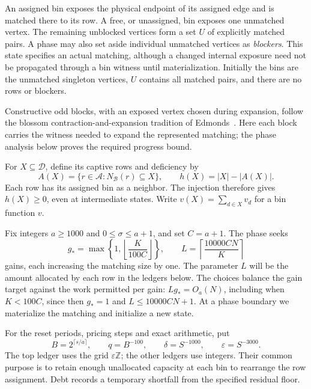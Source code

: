 An assigned bin exposes the physical endpoint of its assigned edge
and is matched there to its row.  A free, or unassigned, bin exposes
one unmatched vertex.  The remaining unblocked vertices form a set
\(U\) of explicitly matched pairs.  A phase may also set aside
individual unmatched vertices as \emph{blockers}.  This state specifies
an actual matching, although a changed internal exposure need not be
propagated through a bin witness until materialization.  Initially the
bins are the unmatched singleton vertices, \(U\) contains all matched
pairs, and there are no rows or blockers.

Constructive odd blocks, with an exposed vertex chosen during expansion,
follow the blossom contraction-and-expansion tradition of
Edmonds~\cite[Sections~4.10--4.14 and 7.1--7.2]{EdmondsPaths}.
Here each block carries the witness needed to expand the represented
matching; the phase analysis below proves the required progress bound.

For \(X\subseteq\mathcal D\), define its captive rows and deficiency by
\begin{equation}
 A(X)=\{r\in\mathcal A:N_{\mathcal B}(r)\subseteq X\},
 \qquad h(X)=|X|-|A(X)|.
 \label{match:deficiency}
\end{equation}
Each row has its assigned bin as a neighbor.  The injection therefore
gives \(h(X)\ge0\), even at intermediate states.
Write \(v(X)=\sum_{d\in X}v_d\) for a bin function \(v\).

Fix integers \(a\ge1000\) and \(0\le\sigma\le a+1\), and set
\(C=a+1\).  The phase seeks
\begin{equation}
 g_*=\max\left\{1,\left\lfloor\frac{K}{100C}\right\rfloor\right\},
 \qquad L=\left\lceil\frac{10000CN}{K}\right\rceil
 \label{match:phase-parameters}
\end{equation}
gains, each increasing the matching size by one.  The parameter \(L\)
will be the amount allocated by each row in the ledgers below.
The choices balance the gain target against the work permitted per
gain: \(Lg_*=O_a(N)\), including when \(K<100C\), since then
\(g_*=1\) and \(L\le10000CN+1\).  At a phase boundary we materialize
the matching and initialize a new state.

For the reset periods, pricing steps and exact arithmetic, put
\begin{equation}
 B=2^{\lceil s/a\rceil},\qquad q=B^{-100},\qquad
 \delta=S^{-1000},\qquad \varepsilon=S^{-3000}.
 \label{match:small-parameters}
\end{equation}
The top ledger uses the grid \(\varepsilon\mathbb Z\); the other
ledgers use integers.  Their common purpose is to retain enough
unallocated capacity at each bin to rearrange the row assignment.
Debt records a temporary shortfall from the specified residual floor.


